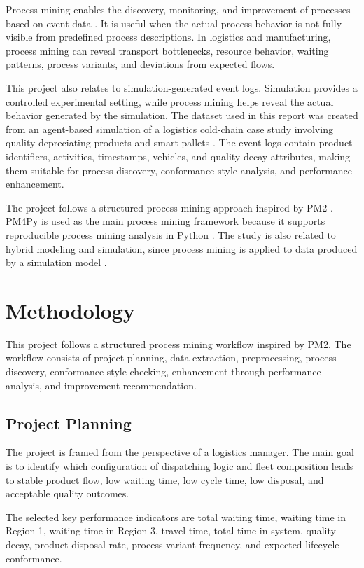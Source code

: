 \documentclass[conference]{IEEEtran}
\begin{document}
Process mining enables the discovery, monitoring, and improvement of processes based on event data \cite{van_der_aalst}. It is useful when the actual process behavior is not fully visible from predefined process descriptions. In logistics and manufacturing, process mining can reveal transport bottlenecks, resource behavior, waiting patterns, process variants, and deviations from expected flows.

This project also relates to simulation-generated event logs. Simulation provides a controlled experimental setting, while process mining helps reveal the actual behavior generated by the simulation. The dataset used in this report was created from an agent-based simulation of a logistics cold-chain case study involving quality-depreciating products and smart pallets \cite{bemthuis2020,dataset}. The event logs contain product identifiers, activities, timestamps, vehicles, and quality decay attributes, making them suitable for process discovery, conformance-style analysis, and performance enhancement.

The project follows a structured process mining approach inspired by PM2 \cite{pm2}. PM4Py is used as the main process mining framework because it supports reproducible process mining analysis in Python \cite{pm4py}. The study is also related to hybrid modeling and simulation, since process mining is applied to data produced by a simulation model \cite{hybrid}.

\section{Methodology}

This project follows a structured process mining workflow inspired by PM2. The workflow consists of project planning, data extraction, preprocessing, process discovery, conformance-style checking, enhancement through performance analysis, and improvement recommendation.

\subsection{Project Planning}

The project is framed from the perspective of a logistics manager. The main goal is to identify which configuration of dispatching logic and fleet composition leads to stable product flow, low waiting time, low cycle time, low disposal, and acceptable quality outcomes.

The selected key performance indicators are total waiting time, waiting time in Region 1, waiting time in Region 3, travel time, total time in system, quality decay, product disposal rate, process variant frequency, and expected lifecycle conformance.
\end{document}
